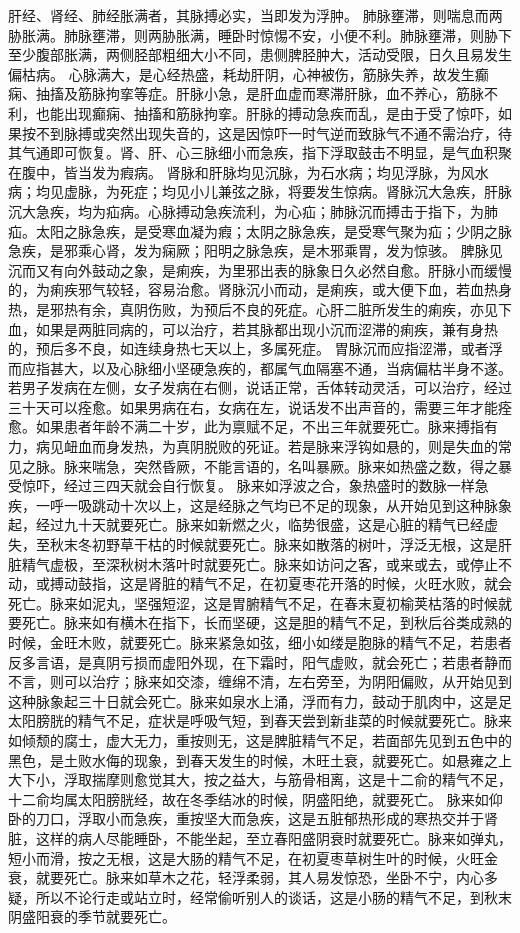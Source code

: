 \documentclass[12pt,UTF8]{ctexbook}
\begin{document}
肝经、肾经、肺经胀满者，其脉搏必实，当即发为浮肿。
肺脉壅滞，则喘息而两胁胀满。肺脉壅滞，则两胁胀满，睡卧时惊惕不安，小便不利。肺脉壅滞，则胁下至少腹部胀满，两侧胫部粗细大小不同，患侧脾胫肿大，活动受限，日久且易发生偏枯病。
心脉满大，是心经热盛，耗劫肝阴，心神被伤，筋脉失养，故发生癫痫、抽搐及筋脉拘挛等症。肝脉小急，是肝血虚而寒滞肝脉，血不养心，筋脉不利，也能出现癫痫、抽搐和筋脉拘挛。肝脉的搏动急疾而乱，是由于受了惊吓，如果按不到脉搏或突然出现失音的，这是因惊吓一时气逆而致脉气不通不需治疗，待其气通即可恢复。肾、肝、心三脉细小而急疾，指下浮取鼓击不明显，是气血积聚在腹中，皆当发为瘕病。
肾脉和肝脉均见沉脉，为石水病；均见浮脉，为风水病；均见虚脉，为死症；均见小儿兼弦之脉，将要发生惊病。肾脉沉大急疾，肝脉沉大急疾，均为疝病。心脉搏动急疾流利，为心疝；肺脉沉而搏击于指下，为肺疝。太阳之脉急疾，是受寒血凝为瘕；太阴之脉急疾，是受寒气聚为疝；少阴之脉急疾，是邪乘心肾，发为痫厥；阳明之脉急疾，是木邪乘胃，发为惊骇。
脾脉见沉而又有向外鼓动之象，是痢疾，为里邪出表的脉象日久必然自愈。肝脉小而缓慢的，为痢疾邪气较轻，容易治愈。肾脉沉小而动，是痢疾，或大便下血，若血热身热，是邪热有余，真阴伤败，为预后不良的死症。心肝二脏所发生的痢疾，亦见下血，如果是两脏同病的，可以治疗，若其脉都出现小沉而涩滞的痢疾，兼有身热的，预后多不良，如连续身热七天以上，多属死症。
胃脉沉而应指涩滞，或者浮而应指甚大，以及心脉细小坚硬急疾的，都属气血隔塞不通，当病偏枯半身不遂。若男子发病在左侧，女子发病在右侧，说话正常，舌体转动灵活，可以治疗，经过三十天可以痊愈。如果男病在右，女病在左，说话发不出声音的，需要三年才能痊愈。如果患者年龄不满二十岁，此为禀赋不足，不出三年就要死亡。脉来搏指有力，病见衄血而身发热，为真阴脱败的死证。若是脉来浮钩如悬的，则是失血的常见之脉。脉来喘急，突然昏厥，不能言语的，名叫暴厥。脉来如热盛之数，得之暴受惊吓，经过三四天就会自行恢复。
脉来如浮波之合，象热盛时的数脉一样急疾，一呼一吸跳动十次以上，这是经脉之气均已不足的现象，从开始见到这种脉象起，经过九十天就要死亡。脉来如新燃之火，临势很盛，这是心脏的精气已经虚失，至秋末冬初野草干枯的时候就要死亡。脉来如散落的树叶，浮泛无根，这是肝脏精气虚极，至深秋树木落叶时就要死亡。脉来如访问之客，或来或去，或停止不动，或搏动鼓指，这是肾脏的精气不足，在初夏枣花开落的时候，火旺水败，就会死亡。脉来如泥丸，坚强短涩，这是胃腑精气不足，在春末夏初榆荚枯落的时候就要死亡。脉来如有横木在指下，长而坚硬，这是胆的精气不足，到秋后谷类成熟的时候，金旺木败，就要死亡。脉来紧急如弦，细小如缕是胞脉的精气不足，若患者反多言语，是真阴亏损而虚阳外现，在下霜时，阳气虚败，就会死亡；若患者静而不言，则可以治疗；脉来如交漆，缠绵不清，左右旁至，为阴阳偏败，从开始见到这种脉象起三十日就会死亡。脉来如泉水上涌，浮而有力，鼓动于肌肉中，这是足太阳膀胱的精气不足，症状是呼吸气短，到春天尝到新韭菜的时候就要死亡。脉来如倾颓的腐士，虚大无力，重按则无，这是脾脏精气不足，若面部先见到五色中的黑色，是土败水侮的现象，到春天发生的时候，木旺土衰，就要死亡。如悬雍之上大下小，浮取揣摩则愈觉其大，按之益大，与筋骨相离，这是十二俞的精气不足，十二俞均属太阳膀胱经，故在冬季结冰的时候，阴盛阳绝，就要死亡。
脉来如仰卧的刀口，浮取小而急疾，重按坚大而急疾，这是五脏郁热形成的寒热交并于肾脏，这样的病人尽能睡卧，不能坐起，至立春阳盛阴衰时就要死亡。脉来如弹丸，短小而滑，按之无根，这是大肠的精气不足，在初夏枣草树生叶的时候，火旺金衰，就要死亡。脉来如草木之花，轻浮柔弱，其人易发惊恐，坐卧不宁，内心多疑，所以不论行走或站立时，经常偷听别人的谈话，这是小肠的精气不足，到秋末阴盛阳衰的季节就要死亡。
\end{document}
